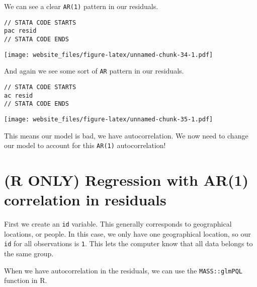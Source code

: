 \documentclass[]{book}
\newenvironment{Shaded}{\begin{snugshade}}{\end{snugshade}}
\newcommand{\KeywordTok}[1]{\textcolor[rgb]{0.13,0.29,0.53}{\textbf{#1}}}
\newcommand{\CommentTok}[1]{\textcolor[rgb]{0.56,0.35,0.01}{\textit{#1}}}
\newcommand{\OperatorTok}[1]{\textcolor[rgb]{0.81,0.36,0.00}{\textbf{#1}}}
\newcommand{\NormalTok}[1]{#1}
\begin{document}
We can see a clear \texttt{AR(1)} pattern in our residuals.

\begin{verbatim}
// STATA CODE STARTS
pac resid
// STATA CODE ENDS
\end{verbatim}

\begin{Shaded}
\end{Shaded}

\texttt{[image: website\_files/figure-latex/unnamed-chunk-34-1.pdf]}

\newpage

And again we see some sort of \texttt{AR} pattern in our residuals.

\begin{verbatim}
// STATA CODE STARTS
ac resid
// STATA CODE ENDS
\end{verbatim}

\begin{Shaded}
\end{Shaded}

\texttt{[image: website\_files/figure-latex/unnamed-chunk-35-1.pdf]}

This means our model is bad, we have autocorrelation. We now need to
change our model to account for this \texttt{AR(1)} autocorrelation!

\newpage

\section{(R ONLY) Regression with AR(1) correlation in
residuals}\label{r-only-regression-with-ar1-correlation-in-residuals}

First we create an \texttt{id} variable. This generally corresponds to
geographical locations, or people. In this case, we only have one
geographical location, so our \texttt{id} for all observations is
\texttt{1}. This lets the computer know that all data belongs to the
same group.

When we have autocorrelation in the residuals, we can use the
\texttt{MASS::glmPQL} function in R.
\end{document}
